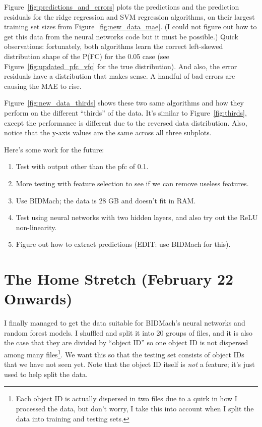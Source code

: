 \documentclass[a4paper, 11pt]{article}
\begin{document}
Figure~\ref{fig:predictions_and_errors} plots the predictions and the prediction residuals for the
ridge regression and SVM regression algorithms, on their largest training set sizes from
Figure~\ref{fig:new_data_mae}. (I could not figure out how to get this data from the neural networks
code but it must be possible.) Quick observations: fortunately, both algorithms learn the correct
left-skewed distribution shape of the P(FC) for the 0.05 case (see Figure~\ref{fig:updated_pfc_vfc}
for the true distribution). And also, the error residuals have a distribution that makes sense. A
handful of bad errors are causing the MAE to rise.

Figure~\ref{fig:new_data_thirds} shows these two same algorithms and how they perform on the
different ``thirds'' of the data. It's similar to Figure~\ref{fig:thirds}, except the performance is
different due to the reversed data distribution. Also, notice that the y-axis values are the same
across all three subplots.

Here's some work for the future:
\begin{enumerate}
    \item Test with output other than the pfc of 0.1.
    \item More testing with feature selection to see if we can remove useless features.
    \item Use BIDMach; the data is 28 GB and doesn't fit in RAM.
    \item Test using neural networks with two hidden layers, and also try out the ReLU
    non-linearity.
    \item Figure out how to extract predictions (EDIT: use BIDMach for this).
\end{enumerate}



\clearpage
\section{The Home Stretch (February 22 Onwards)}

I finally managed to get the data suitable for BIDMach's neural networks and random forest models. I
shuffled and split it into 20 groups of files, and it is also the case that they are divided by
``object ID'' so one object ID is not dispersed among many files\footnote{Each object ID is actually
dispersed in two files due to a quirk in how I processed the data, but don't worry, I take this into
account when I split the data into training and testing sets.}. We want this so that the testing set
consists of object IDs that we have not seen yet. Note that the object ID itself is \emph{not} a
feature; it's just used to help split the data.
\end{document}

